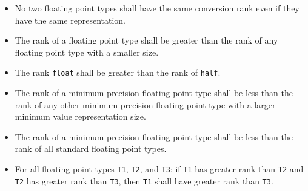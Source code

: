 \begin{itemize}
  \item No two floating point types shall have the same conversion rank even if
  they have the same representation.
  \item The rank of a floating point type shall be greater than the rank of any
  floating point type with a smaller size.
  \item The rank \texttt{float} shall be greater than the rank of \texttt{half}.
  \item The rank of a minimum precision floating point type shall be less than
  the rank of any other minimum precision floating point type with a larger
  minimum value representation size.
  \item The rank of a minimum precision floating point type shall be less than
  the rank of all standard floating point types.
  \item For all floating point types \texttt{T1}, \texttt{T2}, and \texttt{T3}:
  if \texttt{T1} has greater rank than \texttt{T2} and \texttt{T2} has greater
  rank than \texttt{T3}, then \texttt{T1} shall have greater rank than
  \texttt{T3}.
\end{itemize}
